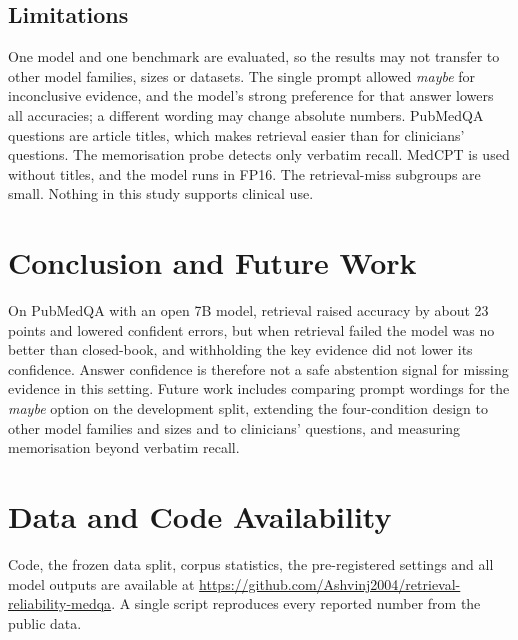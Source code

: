 \documentclass[conference]{IEEEtran}
\begin{document}
\subsection{Limitations}
One model and one benchmark are evaluated, so the results may not transfer to
other model families, sizes or datasets. The single prompt allowed \emph{maybe}
for inconclusive evidence, and the model's strong preference for that answer
lowers all accuracies; a different wording may change absolute numbers. PubMedQA
questions are article titles, which makes retrieval easier than for clinicians'
questions. The memorisation probe detects only verbatim recall. MedCPT is used
without titles, and the model runs in FP16. The retrieval-miss subgroups are
small. Nothing in this study supports clinical use.

\section{Conclusion and Future Work}
On PubMedQA with an open 7B model, retrieval raised accuracy by about 23 points
and lowered confident errors, but when retrieval failed the model was no better
than closed-book, and withholding the key evidence did not lower its confidence.
Answer confidence is therefore not a safe abstention signal for missing evidence
in this setting. Future work includes comparing prompt wordings for the
\emph{maybe} option on the development split, extending the four-condition design
to other model families and sizes and to clinicians' questions, and measuring
memorisation beyond verbatim recall.

\section*{Data and Code Availability}
Code, the frozen data split, corpus statistics, the pre-registered settings and
all model outputs are available at
\url{https://github.com/Ashvinj2004/retrieval-reliability-medqa}. A single script
reproduces every reported number from the public data.



\end{document}
